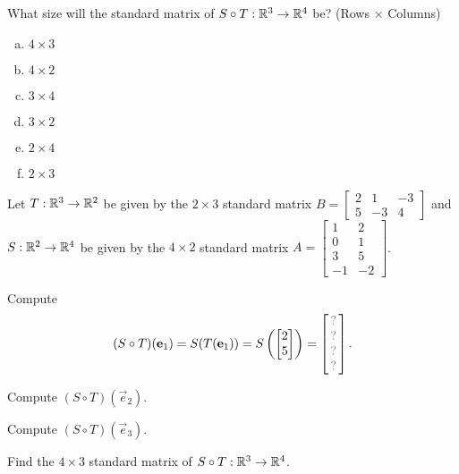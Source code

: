 \begin{applicationActivities}
\begin{activity}{2}
What size will the standard matrix of $S \circ T:\mathbb{R}^3\to\mathbb{R}^4$ be?
(Rows \(\times\) Columns)
\begin{multicols}{3}
\begin{enumerate}[(a)]
\item $4 \times 3$
\item $4 \times 2$
\item $3 \times 4$
\item $3 \times 2$
\item $2 \times 4$
\item $2 \times 3$
\end{enumerate}
\end{multicols}
\end{activity}

\begin{activity}{15}
Let $T: \mathbb{R}^3 \rightarrow \mathbb{R}^2$ be given by the \(2\times 3\) standard matrix $B=\begin{bmatrix} 2 & 1 & -3 \\ 5 & -3 & 4 \end{bmatrix}$ and $S: \mathbb{R}^2 \rightarrow \mathbb{R}^4$ be given by the \(4\times 2\) standard matrix $A=\begin{bmatrix} 1 & 2 \\ 0 & 1 \\ 3 & 5 \\ -1 & -2 \end{bmatrix}$.

\begin{subactivity}
Compute
\[
  (S \circ T)(\vec{e}_1)
    =
  S(T(\vec{e}_1))
    =
  S\left(\begin{bmatrix} 2 \\ 5\end{bmatrix}\right)
        =
  \begin{bmatrix}\unknown\\\unknown\\\unknown\\\unknown\end{bmatrix}.
\]

\end{subactivity}
\begin{subactivity}
Compute
\(
  (S \circ T)(\vec{e}_2)
\).
\end{subactivity}
\begin{subactivity}
Compute
\(
  (S \circ T)(\vec{e}_3)
\).
\end{subactivity}
\begin{subactivity}
Find the \(4\times 3\) standard matrix of $S \circ T:\mathbb{R}^3\to\mathbb{R}^4$.
\end{subactivity}
\end{activity}


\end{applicationActivities}
